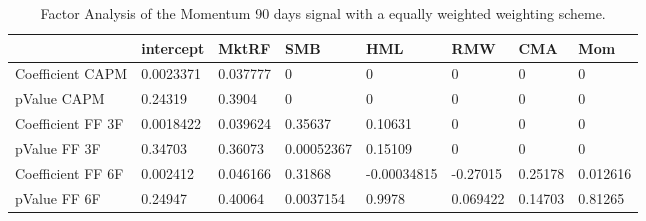 \begin{table}[H]
\centering
\begin{tabular}{llllllll}
\hline& intercept & MktRF & SMB & HML & RMW & CMA & Mom \\ 
\hline 
Coefficient CAPM & 0.0023371 & 0.037777 & 0 & 0 & 0 & 0 & 0 \\ 
pValue CAPM & 0.24319 & 0.3904 & 0 & 0 & 0 & 0 & 0 \\ 
Coefficient FF 3F & 0.0018422 & 0.039624 & 0.35637 & 0.10631 & 0 & 0 & 0 \\ 
pValue FF 3F & 0.34703 & 0.36073 & 0.00052367 & 0.15109 & 0 & 0 & 0 \\ 
Coefficient FF 6F & 0.002412 & 0.046166 & 0.31868 & -0.00034815 & -0.27015 & 0.25178 & 0.012616 \\ 
pValue FF 6F & 0.24947 & 0.40064 & 0.0037154 & 0.9978 & 0.069422 & 0.14703 & 0.81265 \\ 
\hline
\end{tabular}
\caption{Factor Analysis of the Momentum 90 days signal with a equally weighted weighting scheme.}
\label{MOM90EW_FACTOR}
\end{table}